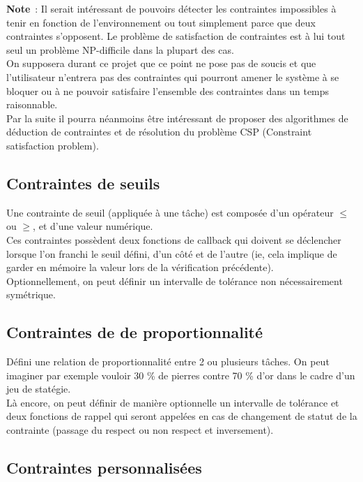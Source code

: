 \textbf{Note}~: Il serait intéressant de pouvoirs détecter les contraintes impossibles à tenir en fonction de l'environnement ou tout simplement parce que deux contraintes s'opposent. Le problème de satisfaction de contraintes est à lui tout seul un problème NP-difficile dans la plupart des cas.\\
\indent On supposera durant ce projet que ce point ne pose pas de soucis et que l'utilisateur n'entrera pas des contraintes qui pourront amener le système à se bloquer ou à ne pouvoir satisfaire l'ensemble des contraintes dans un temps raisonnable.\\
\indent Par la suite il pourra néanmoins être intéressant de proposer des algorithmes de déduction de contraintes et de résolution du problème CSP (Constraint satisfaction problem).

\subsection{Contraintes de seuils}

Une contrainte de seuil (appliquée à une tâche) est composée d'un opérateur $\leq$ ou $\geq$, et d'une valeur numérique.\\
\indent Ces contraintes possèdent deux fonctions de callback qui doivent se déclencher lorsque l'on franchi le seuil défini, d'un côté et de l'autre (ie, cela implique de garder en mémoire la valeur lors de la vérification précédente).\\
\indent Optionnellement, on peut définir un intervalle de tolérance non nécessairement symétrique.

\subsection{Contraintes de de proportionnalité}

Défini une relation de proportionnalité entre 2 ou plusieurs tâches.
On peut imaginer par exemple vouloir 30 \% de pierres contre 70 \% d'or dans le cadre d'un jeu de statégie.\\
\indent Là encore, on peut définir de manière optionnelle un intervalle de tolérance et deux fonctions de rappel qui seront appelées en cas de changement de statut de la contrainte (passage du respect ou non respect et inversement).

\subsection{Contraintes personnalisées}

